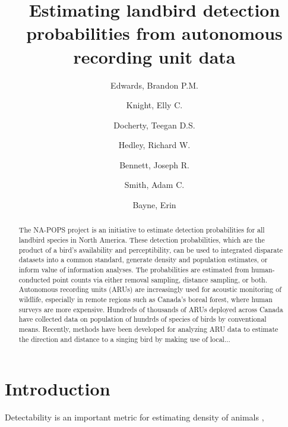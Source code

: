 \documentclass[]{article}
\title{Estimating landbird detection probabilities from autonomous recording unit data}
\author{
	Edwards, Brandon P.M.\\
	\and
	Knight, Elly C.\\
	\and
	Docherty, Teegan D.S.\\
	\and
	Hedley, Richard W.\\
	\and
	Bennett, Joseph R.\\
	\and
	Smith, Adam C.\\
	\and
	Bayne, Erin\\
}
\begin{document}
\maketitle

\begin{abstract}

The NA-POPS project is an initiative to estimate detection probabilities for all landbird species in North America. These detection probabilities, which are the product of a bird's availability and perceptibility, can be used to integrated disparate datasets into a common standard, generate density and population estimates, or inform value of information analyses. The probabilities are estimated from human-conducted point counts via either removal sampling, distance sampling, or both. Autonomous recording units (ARUs) are increasingly used for acoustic monitoring of wildlife, especially in remote regions such as Canada's boreal forest, where human surveys are more expensive. Hundreds of thousands of ARUs deployed across Canada have collected data on population of hundrds of species of birds by conventional means. Recently, methods have been developed for analyzing ARU data to estimate the direction and distance to a singing bird by making use of local...

\end{abstract}

\section{Introduction}
Detectability is an important metric for estimating density of animals \citep{solymos_lessons_2020}, 


\end{document}
